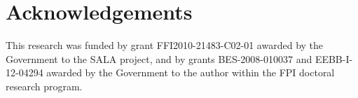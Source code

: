 \documentclass[output=paper]{langsci/langscibook}
\begin{document}
\section*{Acknowledgements}

This research was funded by grant FFI2010-21483-C02-01 awarded by the  Government to the SALA project, and by grants BES-2008-010037 and EEBB-I-12-04294 awarded by the  Government to the author within the FPI doctoral research program.

 
\sloppy
\printbibliography[heading=subbibliography,notkeyword=this] 
\end{document}
